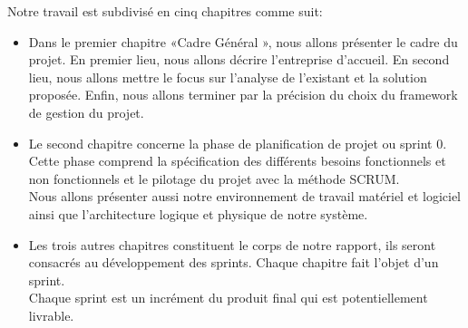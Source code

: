 Notre travail est subdivisé en cinq chapitres comme suit: 
\begin{itemize}
\item Dans le premier chapitre «Cadre Général », nous allons présenter le
cadre du projet. En premier lieu, nous allons décrire l'entreprise d'accueil. En second lieu, nous allons mettre le focus sur l'analyse de l'existant et la solution proposée. Enfin, nous allons terminer par la précision du choix du framework de gestion du projet. 
\item Le second chapitre concerne la phase de planification de projet ou sprint 0. Cette phase comprend la spécification des différents besoins fonctionnels et non fonctionnels et le pilotage du projet avec la méthode SCRUM.\\
Nous allons présenter aussi notre environnement de travail matériel et logiciel ainsi que l'architecture logique et physique de notre système.
\item Les trois autres chapitres constituent le corps de notre rapport, ils seront consacrés au développement des sprints. Chaque chapitre fait l'objet d'un sprint.\\
Chaque sprint est un incrément du produit final qui est potentiellement livrable. 

\end{itemize}


